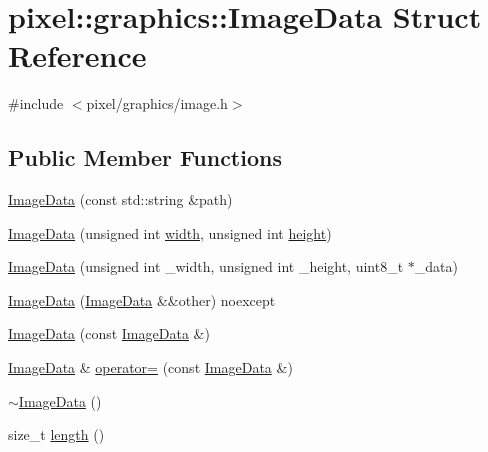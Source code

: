 \hypertarget{structpixel_1_1graphics_1_1_image_data}{}\section{pixel\+:\+:graphics\+:\+:Image\+Data Struct Reference}
\label{structpixel_1_1graphics_1_1_image_data}


{\ttfamily \#include $<$pixel/graphics/image.\+h$>$}

\subsection*{Public Member Functions}
\begin{DoxyCompactItemize}
\item 
\hyperlink{structpixel_1_1graphics_1_1_image_data_a96e29e2b15177d6eca5cf866aba4ead5}{Image\+Data} (const std\+::string \&path)
\item 
\hyperlink{structpixel_1_1graphics_1_1_image_data_a7f64f2823dec8ac7ee891285a43ee318}{Image\+Data} (unsigned int \hyperlink{structpixel_1_1graphics_1_1_image_data_a783c857c18bf3d306f08ff990d0a0387}{width}, unsigned int \hyperlink{structpixel_1_1graphics_1_1_image_data_a0cdbbd8ac40876965eb439f6fb8b8b74}{height})
\item 
\hyperlink{structpixel_1_1graphics_1_1_image_data_a1e4ad1ff6ece0b9e3cf849531ca974b9}{Image\+Data} (unsigned int \+\_\+width, unsigned int \+\_\+height, uint8\+\_\+t $\ast$\+\_\+data)
\item 
\hyperlink{structpixel_1_1graphics_1_1_image_data_a7543c7d858923e3f5cb3f4042c07955d}{Image\+Data} (\hyperlink{structpixel_1_1graphics_1_1_image_data}{Image\+Data} \&\&other) noexcept
\item 
\hyperlink{structpixel_1_1graphics_1_1_image_data_a041260a3b269702c74b645f59c62ac19}{Image\+Data} (const \hyperlink{structpixel_1_1graphics_1_1_image_data}{Image\+Data} \&)
\item 
\hyperlink{structpixel_1_1graphics_1_1_image_data}{Image\+Data} \& \hyperlink{structpixel_1_1graphics_1_1_image_data_a5ccd3224c95beac9deeef32cefcbcef4}{operator=} (const \hyperlink{structpixel_1_1graphics_1_1_image_data}{Image\+Data} \&)
\item 
\hyperlink{structpixel_1_1graphics_1_1_image_data_a539a8d95c83c29749dc039484f03025b}{$\sim$\+Image\+Data} ()
\item 
size\+\_\+t \hyperlink{structpixel_1_1graphics_1_1_image_data_ae0a77895bec7cc75b01c75f266bd3981}{length} ()

\end{DoxyCompactItemize}
